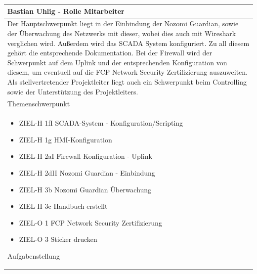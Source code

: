 \documentclass[
	headings=optiontotocandhead,%
	oneside,
	numbers=noenddot,%
	toc=flat, %
	10pt, %
	parskip=full, %
	listof=totoc, %
	listof=flat, %
	numbers=noenddot, %
	bibliography=totoc, %
	a4paper,DIV=14,
]{scrartcl}
\begin{document}
\begin{table}[H]
	\begin{tabularx} {\textwidth} {
			|>{\hsize=1\hsize}X|
		}
		
		\hline
		\rowcolor[HTML]{D9D9D9} 
		\rule{0pt}{15pt}
		\textbf{\normalsize{Bastian Uhlig - Rolle Mitarbeiter}} \\ \hline
		
		\rule{0pt}{20pt}Der Hauptschwerpunkt liegt in der Einbindung der Nozomi Guardian, sowie der Überwachung des Netzwerks mit dieser, wobei dies auch mit Wireshark verglichen wird. Außerdem wird das SCADA System konfiguriert. Zu all diesem gehört die entsprechende Dokumentation. Bei der Firewall wird der Schwerpunkt auf dem Uplink und der entsprechenden Konfiguration von diesem, um eventuell auf die FCP Network Security Zertifizierung auszuweiten. Als stellvertretender Projektleiter liegt auch ein Schwerpunkt beim Controlling sowie der Unterstützung des Projektleiters.\\
		\rule{0pt}{11pt}\textcolor[HTML]{A6A6A6}{\footnotesize{Themenschwerpunkt}} \\ \hline
		
		\begin{itemize}[itemsep=0pt, parsep=0pt, topsep=0pt]
			\item{ZIEL-H 1fI SCADA-System - Konfiguration/Scripting}
			\item{ZIEL-H 1g HMI-Konfiguration}
			\item{ZIEL-H 2aI Firewall Konfiguration - Uplink}
			\item{ZIEL-H 2dII Nozomi Guardian - Einbindung}
			\item{ZIEL-H 3b Nozomi Guardian Überwachung}
			\item{ZIEL-H 3c Handbuch erstellt}
			\item{ZIEL-O 1 FCP Network Security Zertifizierung}
			\item{ZIEL-O 3 Sticker drucken}
		\end{itemize}
		
		\rule{0pt}{11pt}\textcolor[HTML]{A6A6A6}{\footnotesize{Aufgabenstellung}} \\ \hline
	\end{tabularx}
\end{table}
\end{document}
